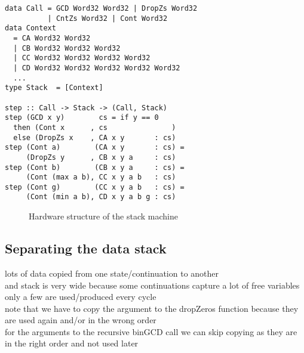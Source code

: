 \documentclass[preprint]{sigplanconf}
\begin{document}
\begin{lstlisting}
data Call = GCD Word32 Word32 | DropZs Word32
          | CntZs Word32 | Cont Word32
data Context
  = CA Word32 Word32
  | CB Word32 Word32 Word32
  | CC Word32 Word32 Word32 Word32
  | CD Word32 Word32 Word32 Word32 Word32
  ...
type Stack  = [Context]

step :: Call -> Stack -> (Call, Stack)
step (GCD x y)        cs = if y == 0
  then (Cont x      , cs               )
  else (DropZs x    , CA x y       : cs)
step (Cont a)        (CA x y       : cs) =
     (DropZs y      , CB x y a     : cs)
step (Cont b)        (CB x y a     : cs) =
     (Cont (max a b), CC x y a b   : cs)
step (Cont g)        (CC x y a b   : cs) =
     (Cont (min a b), CD x y a b g : cs)
\end{lstlisting}

\begin{figure}
\centering
{}
\caption{Hardware structure of the stack machine}
\end{figure}

\subsection{Separating the data stack}

lots of data copied from one state/continuation to another \\
and stack is very wide because some continuations capture a lot of free variables \\
only a few are used/produced every cycle \\
note that we have to copy the argument to the dropZeros function because they are used again and/or in the wrong order \\
for the arguments to the recursive binGCD call we can skip copying as they are in the right order and not used later
\end{document}
